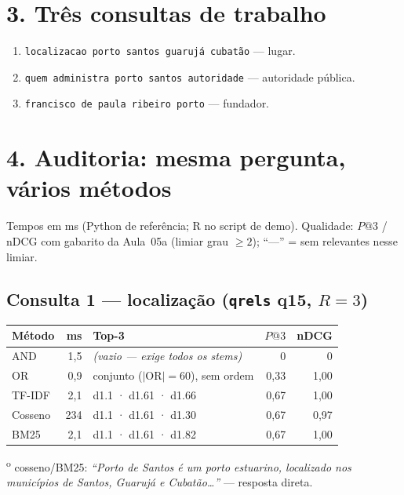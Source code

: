 \documentclass[11pt,a4paper]{article}
\begin{document}
\section*{3. Três consultas de trabalho}
\begin{enumerate}
  \setlength\itemsep{0.15em}
  \item \texttt{localizacao porto santos guarujá cubatão} --- lugar.
  \item \texttt{quem administra porto santos autoridade} --- autoridade pública.
  \item \texttt{francisco de paula ribeiro porto} --- fundador.
\end{enumerate}

\section*{4. Auditoria: mesma pergunta, vários métodos}
Tempos em ms (Python de referência; R no script de demo). Qualidade: $P@3$ / nDCG com
gabarito da Aula~05a (limiar grau $\geq 2$); ``---'' = sem relevantes nesse limiar.

\subsection*{Consulta 1 --- localização (\texttt{qrels} q15, $R{=}3$)}
\begin{center}
\small
\begin{tabular}{@{}l r l r r@{}}
\toprule
Método & ms & Top-3 & $P@3$ & nDCG \\
\midrule
AND & 1,5 & \textit{(vazio --- exige todos os stems)} & 0 & 0 \\
OR & 0,9 & conjunto ($\lvert$OR$\rvert{=}60$), sem ordem & 0,33 & 1,00 \\
TF-IDF & 2,1 & d1.1 · d1.61 · d1.66 & 0,67 & 1,00 \\
Cosseno & 234 & d1.1 · d1.61 · d1.30 & 0,67 & 0,97 \\
BM25 & 2,1 & d1.1 · d1.61 · d1.82 & 0,67 & 1,00 \\
\bottomrule
\end{tabular}
\end{center}
\textsuperscript{o} cosseno/BM25: \emph{``Porto de Santos é um porto estuarino, localizado
nos municípios de Santos, Guarujá e Cubatão\ldots''} --- resposta direta.
\end{document}
